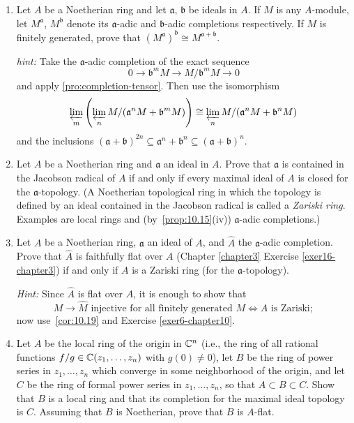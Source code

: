 \begin{enumerate}
    \item \label{exer5-chapter10}Let $A$ be a Noetherian ring and let $\mathfrak{a}$, $\mathfrak{b}$ be ideals in $A$. If $M$ is any $A$-module, let $M^{\mathfrak{a}}$, $M^{\mathfrak{b}}$ denote its $\mathfrak{a}$-adic and $\mathfrak{b}$-adic completions respectively. If $M$ is finitely generated, prove that $(M^{\mathfrak{a}})^{\mathfrak{b}} \cong M^{\mathfrak{a}+\mathfrak{b}}$.
    
    \textit{hint:} Take the $\mathfrak{a}$-adic completion of the exact sequence
    \[
    0 \to \mathfrak{b}^m M \to M/\mathfrak{b}^m M \to 0
    \]
    and apply \eqref{pro:completion-tensor}. Then use the isomorphism
    \[
    \varprojlim_m \left( \varprojlim_n M/(\mathfrak{a}^n M + \mathfrak{b}^m M) \right) \cong \varprojlim_n M/(\mathfrak{a}^n M + \mathfrak{b}^n M)
    \]
    and the inclusions $(\mathfrak{a}+\mathfrak{b})^{2n} \subseteq \mathfrak{a}^n + \mathfrak{b}^n \subseteq (\mathfrak{a}+\mathfrak{b})^n$.

    \item \label{exer6-chapter10}Let $A$ be a Noetherian ring and $\mathfrak{a}$ an ideal in $A$. Prove that $\mathfrak{a}$ is contained in the Jacobson radical of $A$ if and only if every maximal ideal of $A$ is closed for the $\mathfrak{a}$-topology. (A Noetherian topological ring in which the topology is defined by an ideal contained in the Jacobson radical is called a \emph{Zariski ring}. Examples are local rings and (by~\eqref{prop:10.15}(iv)) $\mathfrak{a}$-adic completions.)

    \item \label{exer7-chapter10}Let $A$ be a Noetherian ring, $\mathfrak{a}$ an ideal of $A$, and $\hat{A}$ the $\mathfrak{a}$-adic completion. Prove that $\hat{A}$ is faithfully flat over $A$ (Chapter \ref{chapter3} Exercise \ref{exer16-chapter3}) if and only if $A$ is a Zariski ring (for the $\mathfrak{a}$-topology).
    
    \textit{Hint:} Since $\hat{A}$ is flat over $A$, it is enough to show that
    \[
    M \to \hat{M} \text{ injective for all finitely generated } M \Leftrightarrow A \text{ is Zariski};
    \]
    now use~\eqref{cor:10.19} and Exercise \ref{exer6-chapter10}.

    \item \label{exer8-chapter10}Let $A$ be the local ring of the origin in $\mathbb{C}^n$ (i.e., the ring of all rational functions $f/g \in \mathbb{C}(z_1, \ldots, z_n)$ with $g(0) \neq 0$), let $B$ be the ring of power series in $z_1, \ldots, z_n$ which converge in some neighborhood of the origin, and let $C$ be the ring of formal power series in $z_1, \ldots, z_n$, so that $A \subset B \subset C$. Show that $B$ is a local ring and that its completion for the maximal ideal topology is $C$. Assuming that $B$ is Noetherian, prove that $B$ is $A$-flat. 
    

\end{enumerate}
